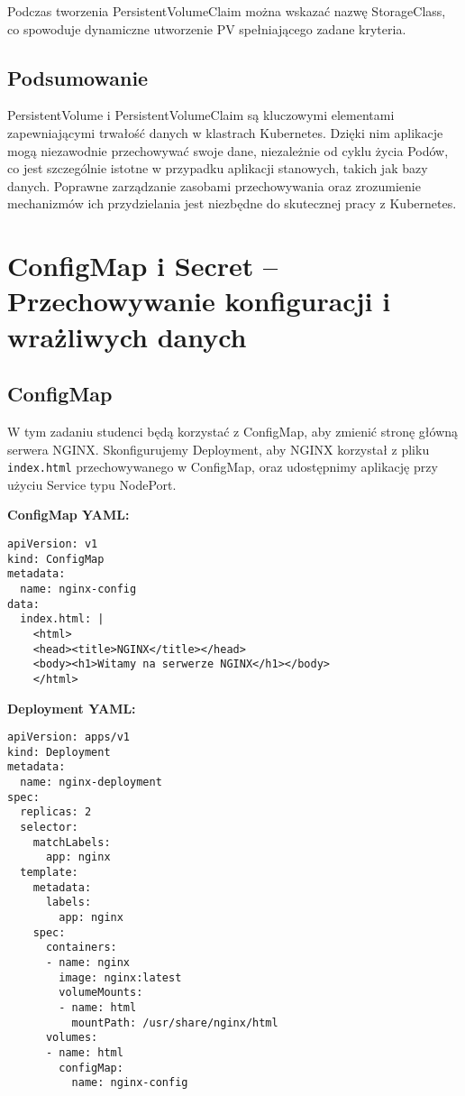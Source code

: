 \documentclass{article}
\begin{document}
Podczas tworzenia PersistentVolumeClaim można wskazać nazwę StorageClass, co spowoduje dynamiczne utworzenie PV spełniającego zadane kryteria.

\subsection{Podsumowanie}

PersistentVolume i PersistentVolumeClaim są kluczowymi elementami zapewniającymi trwałość danych w klastrach Kubernetes. Dzięki nim aplikacje mogą niezawodnie przechowywać swoje dane, niezależnie od cyklu życia Podów, co jest szczególnie istotne w przypadku aplikacji stanowych, takich jak bazy danych. Poprawne zarządzanie zasobami przechowywania oraz zrozumienie mechanizmów ich przydzielania jest niezbędne do skutecznej pracy z Kubernetes.


\section{ConfigMap i Secret – Przechowywanie konfiguracji i wrażliwych danych}

\subsection{ConfigMap} 
W tym zadaniu studenci będą korzystać z ConfigMap, aby zmienić stronę główną serwera NGINX. Skonfigurujemy Deployment, aby NGINX korzystał z pliku \texttt{index.html} przechowywanego w ConfigMap, oraz udostępnimy aplikację przy użyciu Service typu NodePort.

\textbf{ConfigMap YAML:}
\begin{lstlisting}
apiVersion: v1
kind: ConfigMap
metadata:
  name: nginx-config
data:
  index.html: |
    <html>
    <head><title>NGINX</title></head>
    <body><h1>Witamy na serwerze NGINX</h1></body>
    </html>
\end{lstlisting}

\textbf{Deployment YAML:}
\begin{lstlisting}
apiVersion: apps/v1
kind: Deployment
metadata:
  name: nginx-deployment
spec:
  replicas: 2
  selector:
    matchLabels:
      app: nginx
  template:
    metadata:
      labels:
        app: nginx
    spec:
      containers:
      - name: nginx
        image: nginx:latest
        volumeMounts:
        - name: html
          mountPath: /usr/share/nginx/html
      volumes:
      - name: html
        configMap:
          name: nginx-config
\end{lstlisting}
\end{document}
